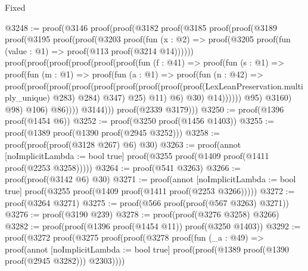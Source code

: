 \begin{lexlean}{Fixed}
\begin{coremodule}
@3248 := proof(@3146
      proof(proof(@3182
            proof(@3185
                proof(proof(@3189
                      proof(@3195
                          proof(proof(@3203
                                proof(fun (x : @2) =>
                                  proof(@3205
                                      proof(fun (value : @1) => proof(@113 proof(@3214 @14))))))
                              proof(proof(proof(proof(proof(proof(fun (f : @41) =>
                                          proof(fun (s : @1) =>
                                            proof(fun (m : @1) =>
                                              proof(fun (a : @1) =>
                                                proof(fun (n : @42) =>
                                                  proof(proof(proof(proof(proof(proof(proof(proof(proof(LexLeanPreservation.multiply_unique)
                                                                    @283)
                                                                  @284)
                                                                @347)
                                                              @25)
                                                            @11)
                                                          @6)
                                                        @30)
                                                      @14))))))
                                          @95)
                                        @3160)
                                      @98)
                                    @106)
                                  @86))))
                    @3144)))
          proof(@2339 @3179)))
@3250 := proof(@1396 proof(@1454 @6))
@3252 := proof(@3250 proof(@1456 @1403))
@3255 := proof(@1389 proof(@1390 proof(@2945 @3252)))
@3258 := proof(proof(proof(@3128 @267) @6) @30)
@3263 := proof(annot [noImplicitLambda := bool true]
    proof(@3255 proof(@1409 proof(@1411 proof(@2253 @3258)))))
@3264 := proof(@541 @3263)
@3266 := proof(proof(@3142 @6) @30)
@3271 := proof(annot [noImplicitLambda := bool true]
    proof(@3255 proof(@1409 proof(@1411 proof(@2253 @3266)))))
@3272 := proof(@3264 @3271)
@3275 := proof(@566 proof(proof(@567 @3263) @3271))
@3276 := proof(@3190 @239)
@3278 := proof(proof(@3276 @3258) @3266)
@3282 := proof(proof(@1396 proof(@1454 @11)) proof(@3250 @1403))
@3292 := proof(@3272
      proof(@3275
          proof(proof(@3278
                proof(fun (_a : @49) =>
                  proof(annot [noImplicitLambda := bool true]
                    proof(proof(@1389 proof(@1390 proof(@2945 @3282))) @2303))))

\end{coremodule}
\end{lexlean}
